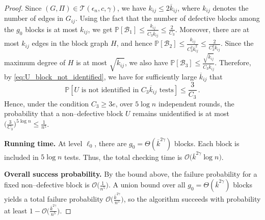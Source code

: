 \documentclass[journal]{IEEEtran}
\theoremstyle{definition}
\theoremstyle{definition}
\newcommand{\Bc}{\mathcal{B}}
\newcommand{\Tc}{\mathcal{T}}
\newcommand{\PP}{\mathbb{P}}
\newcommand{\kb}{\overline{k}}
\newcommand{\bigO}{\mathcal{O}}
\begin{document}
\begin{proof}
Since \((G,\Pi)\in \Tc(\epsilon_n,c,\gamma)\), we have \(k_{ij}\le 2\kb_{ij}\), where \(k_{ij}\) denotes the number of edges in \(G_{ij}\).
Using the fact that the number of defective blocks among the \(g_0\) blocks is at most \(k_{ij}\), we get
\(\PP[\Bc_1] \le \tfrac{k_{ij}}{C_3\kb_{ij}} \le \tfrac{2}{C_3}\).
Moreover, there are at most \(k_{ij}\) edges in the block graph \(H\), and hence
\(\PP[\Bc_2] \le \tfrac{k_{ij}}{C_3^{2}\kb_{ij}^{2}} \le \tfrac{2}{C_3^{2}\kb_{ij}}\). Since the maximum degree of $H$ is at most $\sqrt{\kb_{ij}}$, we also have $\PP[\Bc_3] \leq \tfrac{\sqrt{\kb_{ij}}}{C_3\kb_{ij}}$. Therefore, by \eqref{eq:U_block_not_identified}, we have for sufficiently large $\kb_{ij}$ that
\[
\PP \left[ U \text{ is not identified in } C_3\kb_{ij} \text{ tests} \right] \le \frac{3}{C_3}\,.
\]
Hence, under the condition \(C_3 \ge 3e\), over \(5\log n\) independent rounds, the probability that a non–defective block \(U\) remains unidentified is at most
\(\Big(\tfrac{3}{C_3}\Big)^{5\log n} \le \tfrac{1}{n^{5}}\). %

\textbf{Running time.}
At level \(\ell_0\), there are \(g_0=\Theta(\kb^{2\gamma})\) blocks.
Each block is included in \(5\log n\) tests.
Thus, the total checking time is \(\bigO \big(\kb^{2\gamma}\log n\big)\).

\textbf{Overall success probability.}
By the bound above, the failure probability for a fixed non–defective block is \(\bigO \big(\tfrac{1}{n^{5}}\big)\).
A union bound over all \(g_0=\Theta(\kb^{2\gamma})\) blocks yields a total failure probability
\(\bigO \big(\tfrac{\kb^{2\gamma}}{n^{5}}\big)\), so the algorithm succeeds with probability at least
\(1-\bigO \big(\tfrac{\kb^{2\gamma}}{n^{5}}\big)\).


\end{proof}
\end{document}
